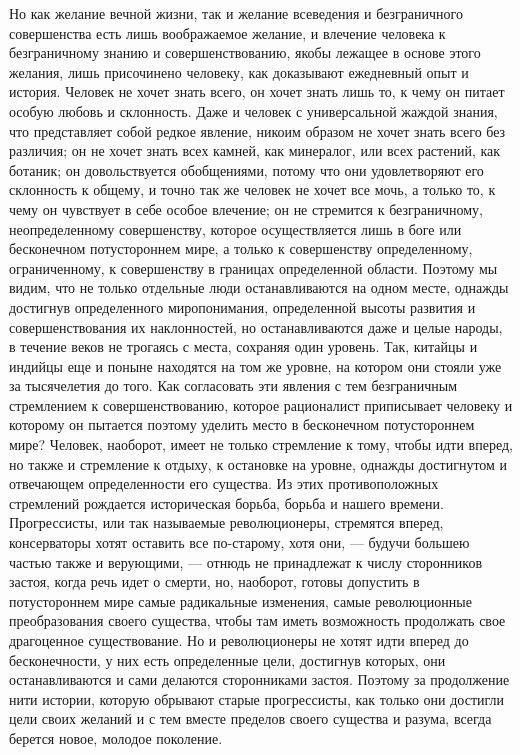 \documentclass[12pt]{article}
\begin{document}
Но как желание вечной жизни, так и желание всеведения и безграничного совершенства есть лишь воображаемое желание, и влечение человека к безграничному знанию и совершенствованию, якобы лежащее в основе этого желания, лишь присочинено человеку, как доказывают ежедневный опыт и история. Человек не хочет знать всего, он хочет знать лишь то, к чему он питает особую любовь и склонность. Даже и человек с универсальной жаждой знания, что представляет собой редкое явление, никоим образом не хочет знать всего без различия; он не хочет знать всех камней, как минералог, или всех растений, как ботаник; он довольствуется обобщениями, потому что они удовлетворяют его склонность к общему, и точно так же человек не хочет все мочь, а только то, к чему он чувствует в себе особое влечение; он не стремится к безграничному, неопределенному совершенству, которое осуществляется лишь в боге или бесконечном потустороннем мире, а только к совершенству определенному, ограниченному, к совершенству в границах определенной области. Поэтому мы видим, что не только отдельные люди останавливаются на одном месте, однажды достигнув определенного миропонимания, определенной высоты развития и совершенствования их наклонностей, но останавливаются даже и целые народы, в течение веков не трогаясь с места, сохраняя один уровень. Так, китайцы и индийцы еще и поныне находятся на том же уровне, на котором они стояли уже за тысячелетия до того. Как согласовать эти явления с тем безграничным стремлением к совершенствованию, которое рационалист приписывает человеку и которому он пытается поэтому уделить место в бесконечном потустороннем мире? Человек, наоборот, имеет не только стремление к тому, чтобы идти вперед, но также и стремление к отдыху, к остановке на уровне, однажды достигнутом и отвечающем определенности его существа. Из этих противоположных стремлений рождается историческая борьба, борьба и нашего времени. Прогрессисты, или так называемые революционеры, стремятся вперед, консерваторы хотят оставить все по-старому, хотя они, --- будучи большею частью также и верующими, --- отнюдь не принадлежат к числу сторонников застоя, когда речь идет о смерти, но, наоборот, готовы допустить в потустороннем мире самые радикальные изменения, самые революционные преобразования своего существа, чтобы там иметь возможность продолжать свое драгоценное существование. Но и революционеры не хотят идти вперед до бесконечности, у них есть определенные цели, достигнув которых, они останавливаются и сами делаются сторонниками застоя. Поэтому за продолжение нити истории, которую обрывают старые прогрессисты, как только они достигли цели своих желаний и с тем вместе пределов своего существа и разума, всегда берется новое, молодое поколение. 
\end{document}
